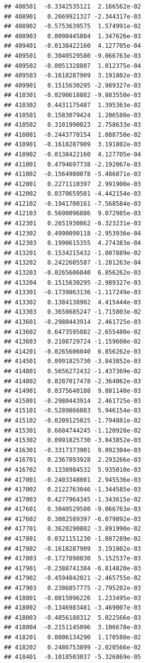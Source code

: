 \documentclass[ignorenonframetext,]{beamer}
\begin{document}
\begin{frame}[fragile]
\begin{verbatim}
## 408501  -0.3342535121  2.166562e-02
## 408901   0.2669921327 -2.344317e-03
## 408902  -0.5753639575  1.574991e-02
## 408903   0.0098445804  1.347626e-03
## 409401  -0.0138422160  4.127705e-04
## 409501   0.3040529580 -9.066763e-03
## 409502  -0.0051328807  1.012375e-04
## 409503  -0.1618287909  3.191802e-03
## 409901   0.1515630295 -2.989327e-03
## 410301  -0.0290618882 -9.883550e-03
## 410302   0.4431175487  1.395363e-02
## 410501   0.1583079424  1.206580e-03
## 410502   0.3101990023  2.758633e-03
## 410801  -0.2443770154  1.088750e-02
## 410901  -0.1618287909  3.191802e-03
## 410902  -0.0138422160  4.127705e-04
## 411001   0.4794697738 -2.192067e-03
## 411002  -0.1564980078 -5.486871e-03
## 412001   0.2271110397  2.991900e-03
## 412002   0.0370659501 -4.442154e-03
## 412102  -0.1941700161 -7.568584e-03
## 412103   0.5690096886  9.072985e-03
## 412301   0.2651930862 -6.323231e-03
## 412302   0.4990090118 -2.953936e-04
## 412303   0.1990615355  4.274383e-04
## 413201   0.1534215432 -1.007889e-02
## 413202   0.2422605587 -1.281263e-04
## 413203  -0.0265606040  6.856262e-03
## 413204   0.1515630295 -2.989327e-03
## 413301  -0.1739863136 -1.117249e-03
## 413302   0.1384138902  4.415444e-03
## 413303   0.3658685247 -1.715803e-02
## 413601  -0.2980443914  2.461725e-03
## 413602   0.6473595882 -2.655480e-02
## 413603   0.2108729724 -1.159608e-02
## 414201  -0.0265606040  6.856262e-03
## 414501   0.0991825730 -3.843852e-03
## 414801   0.5656272432 -1.437369e-02
## 414802   0.0207017478 -2.364062e-03
## 414901   0.0375640108  9.881140e-03
## 415001  -0.2980443914  2.461725e-03
## 415101  -0.5289866083  5.946154e-03
## 415102  -0.0209125025 -1.794881e-02
## 415301   0.6604744245 -1.120928e-02
## 415302   0.0991825730 -3.843852e-03
## 416301  -0.3317373901  9.892304e-03
## 416701   0.2367893928  2.293266e-03
## 416702   0.1338984532  5.935010e-03
## 417001  -0.2403348081  2.945536e-03
## 417002   0.2122763046 -1.344585e-03
## 417003   0.4277964345 -1.343615e-02
## 417601   0.3040529580 -9.066763e-03
## 417602   0.3082589397 -6.079892e-03
## 417701   0.3620290802 -3.891990e-02
## 417801   0.0321151230 -1.807289e-02
## 417802  -0.1618287909  3.191802e-03
## 417803  -0.1727898030  5.152537e-03
## 417901  -0.2388741384 -6.814820e-03
## 417902  -0.4594842021 -2.465755e-02
## 417903   0.2386857775 -2.795202e-03
## 418001  -0.0815096226  1.233495e-03
## 418002  -0.1346983481 -3.469007e-03
## 418003  -0.4856188312  5.022566e-03
## 418004  -0.2151145096  3.106678e-03
## 418201   0.0806134290  1.170580e-02
## 418202   0.2486753899 -2.020566e-02
## 418401  -0.1018503037 -5.326869e-05

\end{verbatim}
\end{frame}
\end{document}
